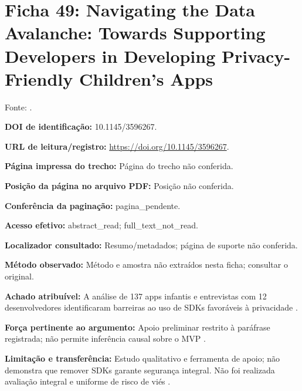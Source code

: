 \clearpage\section*{Ficha 49: Navigating the Data Avalanche: Towards Supporting Developers in Developing Privacy-Friendly Children’s Apps}

Fonte: \citet{OS13}.

\noindent\textbf{DOI de identificação:} 10.1145/3596267.\par\medskip

\noindent\textbf{URL de leitura/registro:} \url{https://doi.org/10.1145/3596267}.\par\medskip

\noindent\textbf{Página impressa do trecho:} Página do trecho não conferida.\par\medskip

\noindent\textbf{Posição da página no arquivo PDF:} Posição não conferida.\par\medskip

\noindent\textbf{Conferência da paginação:} pagina\_pendente.\par\medskip

\noindent\textbf{Acesso efetivo:} abstract\_read; full\_text\_not\_read.\par\medskip

\noindent\textbf{Localizador consultado:} Resumo/metadados; página de suporte não conferida.\par\medskip

\noindent\textbf{Método observado:} Método e amostra não extraídos nesta ficha; consultar o original.\par\medskip

\noindent\textbf{Achado atribuível:} A análise de 137 apps infantis e entrevistas com 12 desenvolvedores identificaram barreiras ao uso de SDKs favoráveis à privacidade \citep{OS13}.\par\medskip

\noindent\textbf{Força pertinente ao argumento:} Apoio preliminar restrito à paráfrase registrada; não permite inferência causal sobre o MVP \citep{OS13}.\par\medskip

\noindent\textbf{Limitação e transferência:} Estudo qualitativo e ferramenta de apoio; não demonstra que remover SDKs garante segurança integral. Não foi realizada avaliação integral e uniforme de risco de viés \citep{OS13}.\par\medskip

